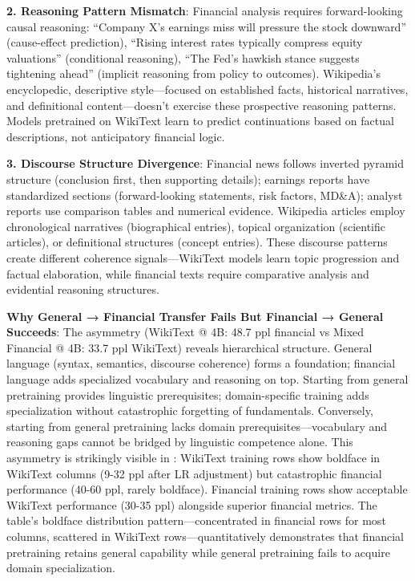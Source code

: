 \textbf{2. Reasoning Pattern Mismatch}: Financial analysis requires forward-looking causal reasoning: ``Company X's earnings miss will pressure the stock downward'' (cause-effect prediction), ``Rising interest rates typically compress equity valuations'' (conditional reasoning), ``The Fed's hawkish stance suggests tightening ahead'' (implicit reasoning from policy to outcomes). Wikipedia's encyclopedic, descriptive style—focused on established facts, historical narratives, and definitional content—doesn't exercise these prospective reasoning patterns. Models pretrained on WikiText learn to predict continuations based on factual descriptions, not anticipatory financial logic.

\textbf{3. Discourse Structure Divergence}: Financial news follows inverted pyramid structure (conclusion first, then supporting details); earnings reports have standardized sections (forward-looking statements, risk factors, MD\&A); analyst reports use comparison tables and numerical evidence. Wikipedia articles employ chronological narratives (biographical entries), topical organization (scientific articles), or definitional structures (concept entries). These discourse patterns create different coherence signals—WikiText models learn topic progression and factual elaboration, while financial texts require comparative analysis and evidential reasoning structures.

\textbf{Why General → Financial Transfer Fails But Financial → General Succeeds}: The asymmetry (WikiText @ 4B: 48.7 ppl financial vs Mixed Financial @ 4B: 33.7 ppl WikiText) reveals hierarchical structure. General language (syntax, semantics, discourse coherence) forms a foundation; financial language adds specialized vocabulary and reasoning on top. Starting from general pretraining provides linguistic prerequisites; domain-specific training adds specialization without catastrophic forgetting of fundamentals. Conversely, starting from general pretraining lacks domain prerequisites—vocabulary and reasoning gaps cannot be bridged by linguistic competence alone. This asymmetry is strikingly visible in : WikiText training rows show boldface in WikiText columns (9-32 ppl after LR adjustment) but catastrophic financial performance (40-60 ppl, rarely boldface). Financial training rows show acceptable WikiText performance (30-35 ppl) alongside superior financial metrics. The table's boldface distribution pattern—concentrated in financial rows for most columns, scattered in WikiText rows—quantitatively demonstrates that financial pretraining retains general capability while general pretraining fails to acquire domain specialization.

